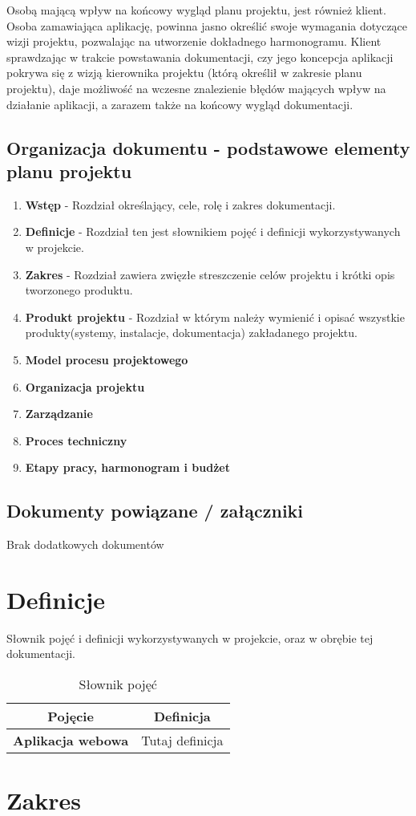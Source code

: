 \documentclass[12pt,a4paper]{article}
\begin{document}
Osobą mającą wpływ na końcowy wygląd planu projektu, jest również klient. Osoba zamawiająca aplikację, powinna jasno określić swoje wymagania dotyczące wizji projektu, pozwalając na utworzenie dokładnego harmonogramu. Klient sprawdzając w trakcie powstawania dokumentacji, czy jego koncepcja aplikacji pokrywa się z wizją kierownika projektu (którą określił w zakresie planu projektu), daje możliwość na wczesne znalezienie błędów mających wpływ na działanie aplikacji, a zarazem także na końcowy wygląd dokumentacji. 

\subsection{Organizacja dokumentu - podstawowe elementy planu projektu}

\begin{enumerate}
    \item \textbf{Wstęp} - Rozdział określający, cele, rolę i zakres dokumentacji.
    \item \textbf{Definicje} - Rozdział ten jest słownikiem pojęć i definicji wykorzystywanych w projekcie.
    \item \textbf{Zakres} - Rozdział zawiera zwięzłe streszczenie celów projektu i krótki opis tworzonego produktu.
    \item \textbf{Produkt projektu} - Rozdział w którym należy wymienić i opisać wszystkie produkty(systemy, instalacje, dokumentacja) zakładanego projektu.
    \item \textbf{Model procesu projektowego}
    \item \textbf{Organizacja projektu}
    \item \textbf{Zarządzanie}
    \item \textbf{Proces techniczny}
    \item \textbf{Etapy pracy, harmonogram i budżet}
\end{enumerate}

\subsection{Dokumenty powiązane / załączniki}
Brak dodatkowych dokumentów

\newpage

\section{Definicje}

Słownik pojęć i definicji wykorzystywanych w projekcie, oraz w obrębie tej dokumentacji. 

\begin{table}[htb]
\centering
  \begin{tabular}{c|c}
  \hline
  {\bf Pojęcie} & {\bf Definicja} \\
  \hline
  \textbf{Aplikacja webowa} & Tutaj definicja\\
  \hline
  \end{tabular}
\caption{Słownik pojęć}
\label{tab:slownik}
\end{table}

\newpage

\section{Zakres}
\end{document}
